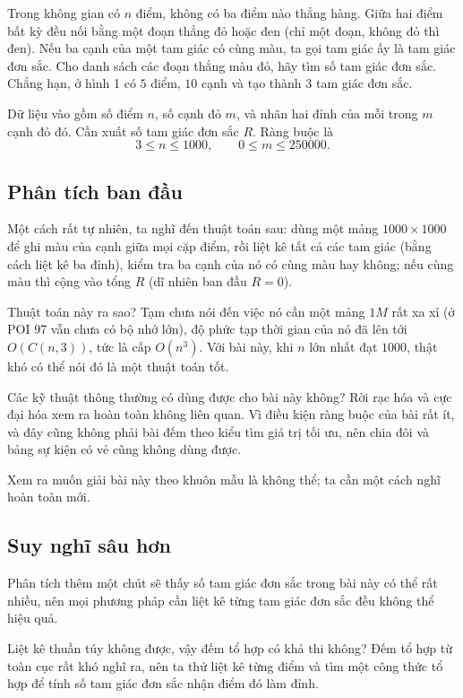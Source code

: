 \documentclass[11pt]{article}
\begin{document}
Trong không gian có \(n\) điểm, không có ba điểm nào thẳng hàng. Giữa hai
điểm bất kỳ đều nối bằng một đoạn thẳng đỏ hoặc đen (chỉ một đoạn, không
đỏ thì đen). Nếu ba cạnh của một tam giác có cùng màu, ta gọi tam giác ấy
là tam giác đơn sắc. Cho danh sách các đoạn thẳng màu đỏ, hãy tìm số tam
giác đơn sắc. Chẳng hạn, ở hình 1 có \(5\) điểm, \(10\) cạnh và tạo thành
\(3\) tam giác đơn sắc.

Dữ liệu vào gồm số điểm \(n\), số cạnh đỏ \(m\), và nhãn hai đỉnh của mỗi
trong \(m\) cạnh đỏ đó. Cần xuất số tam giác đơn sắc \(R\). Ràng buộc là
\[
  3 \le n \le 1000,\qquad 0 \le m \le 250000.
\]

\subsection{Phân tích ban đầu}

Một cách rất tự nhiên, ta nghĩ đến thuật toán sau: dùng một mảng
\(1000\times 1000\) để ghi màu của cạnh giữa mọi cặp điểm, rồi liệt kê
tất cả các tam giác (bằng cách liệt kê ba đỉnh), kiểm tra ba cạnh của nó
có cùng màu hay không; nếu cùng màu thì cộng vào tổng \(R\) (dĩ nhiên ban
đầu \(R=0\)).

Thuật toán này ra sao? Tạm chưa nói đến việc nó cần một mảng \(1M\) rất
xa xỉ (ở POI 97 vẫn chưa có bộ nhớ lớn), độ phức tạp thời gian của nó đã
lên tới \(O(C(n,3))\), tức là cấp \(O(n^3)\). Với bài này, khi \(n\) lớn
nhất đạt \(1000\), thật khó có thể nói đó là một thuật toán tốt.

Các kỹ thuật thông thường có dùng được cho bài này không? Rời rạc hóa và
cực đại hóa xem ra hoàn toàn không liên quan. Vì điều kiện ràng buộc của
bài rất ít, và đây cũng không phải bài đếm theo kiểu tìm giá trị tối ưu,
nên chia đôi và bảng sự kiện có vẻ cũng không dùng được.

Xem ra muốn giải bài này theo khuôn mẫu là không thể; ta cần một cách
nghĩ hoàn toàn mới.

\subsection{Suy nghĩ sâu hơn}

Phân tích thêm một chút sẽ thấy số tam giác đơn sắc trong bài này có thể
rất nhiều, nên mọi phương pháp cần liệt kê từng tam giác đơn sắc đều
không thể hiệu quả.

Liệt kê thuần túy không được, vậy đếm tổ hợp có khả thi không? Đếm tổ hợp
từ toàn cục rất khó nghĩ ra, nên ta thử liệt kê từng điểm và tìm một công
thức tổ hợp để tính số tam giác đơn sắc nhận điểm đó làm đỉnh.
\end{document}
